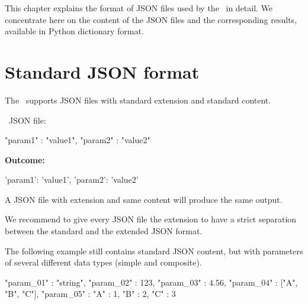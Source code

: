 




\label{thejsonpformat}

This chapter explains the format of JSON files used by the \pkg\ in detail. We concentrate here on the content of the JSON files
and the corresponding results, available in Python dictionary format.

\section{Standard JSON format}

The \pkg\ supports JSON files with standard extension  and standard content.

\textbullet\ JSON file:

\begin{pythoncode}
{
   "param1" : "value1",
   "param2" : "value2"
}
\end{pythoncode}

\textbf{Outcome:}

\begin{pythonlog}
{'param1': 'value1', 'param2': 'value2'}
\end{pythonlog}

A JSON file with extension  and same content will produce the same output.

We recommend to give every JSON file the extension  to have a strict separation between the standard and the extended JSON format.

The following example still contains standard JSON content, but with parameters of several different data types (simple and composite).

\begin{pythoncode}
{
   "param_01" : "string",
   "param_02" : 123,
   "param_03" : 4.56,
   "param_04" : ["A", "B", "C"],
   "param_05" : {"A" : 1, "B" : 2, "C" : 3}
}
\end{pythoncode}

